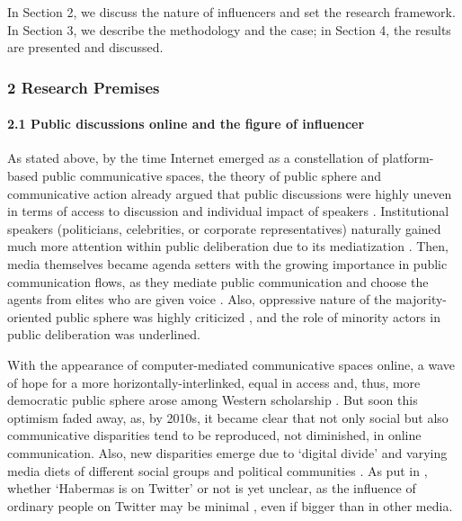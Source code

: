 In Section 2, we discuss the nature of influencers and set the research framework. In Section 3, we describe the methodology and the case; in Section 4, the results are presented and discussed.

\subsubsection{2 Research Premises}

\paragraph{2.1 Public discussions online and the figure of influencer}
As stated above, by the time Internet emerged as a constellation of platform-based public communicative spaces, the theory of public sphere and communicative action \cite{HabermasDerOffentlichkeit,Habermas1990} already argued that public discussions were highly uneven in terms of access to discussion and individual impact of speakers \cite{Nieminen}. Institutional speakers (politicians, celebrities, or corporate representatives) naturally gained much more attention within public deliberation due to its mediatization \cite{Calhoun,Schulz}. Then, media themselves became agenda setters \cite{McCombsShaw,McCombs} with the growing importance in public communication flows, as they mediate public communication and choose the agents from elites who are given voice \cite[p.~416]{Habermas}. Also, oppressive nature of the majority-oriented public sphere was highly criticized \cite{Fraser,LaclauMouffe,Dahlberg,FentonDowney}\textbf{}, and the role of minority actors in public deliberation was underlined.

With the appearance of computer-mediated communicative spaces online, a wave of hope for a more horizontally-interlinked, equal in access and, thus, more democratic public sphere arose among Western scholarship \cite{Fuchs}. But soon this optimism faded away, as, by 2010s, it became clear that not only social \cite{Nakamura} but also communicative \cite{Daniels} disparities tend to be reproduced, not diminished, in online communication. Also, new disparities emerge due to ‘digital divide’ \cite{Norris,VanDeursenVanDijk} and varying media diets of different social groups and political communities \cite{PfetschAdam,BodrunovaLitvinenko2015}. As put in \cite{BrunsHighfeld2016}, whether ‘Habermas is on Twitter’ or not is yet unclear, as the influence of ordinary people on Twitter may be minimal \cite[p.~31]{Murthy} \cite[p.~192]{Fuchs}, even if bigger than in other media.

